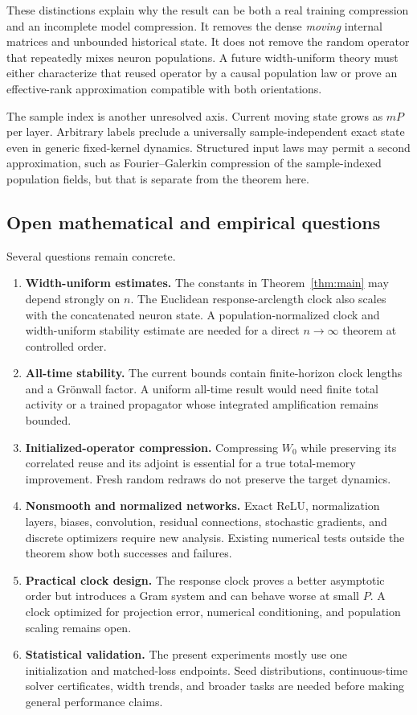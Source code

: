 These distinctions explain why the result can be both a real training
compression and an incomplete model compression.  It removes the dense
\emph{moving} internal matrices and unbounded historical state.  It does not
remove the random operator that repeatedly mixes neuron populations.  A future
width-uniform theory must either characterize that reused operator by a causal
population law or prove an effective-rank approximation compatible with both
orientations.

The sample index is another unresolved axis.  Current moving state grows as
$mP$ per layer.  Arbitrary labels preclude a universally sample-independent
exact state even in generic fixed-kernel dynamics.  Structured input laws may
permit a second approximation, such as Fourier--Galerkin compression of the
sample-indexed population fields, but that is separate from the theorem here.

\subsection{Open mathematical and empirical questions}

Several questions remain concrete.

\begin{enumerate}[leftmargin=*]
\item \textbf{Width-uniform estimates.}  The constants in
      Theorem~\ref{thm:main} may depend strongly on $n$.  The Euclidean
      response-arclength clock also scales with the concatenated neuron state.
      A population-normalized clock and width-uniform stability estimate are
      needed for a direct $n\to\infty$ theorem at controlled order.
\item \textbf{All-time stability.}  The current bounds contain finite-horizon
      clock lengths and a Gr\"onwall factor.  A uniform all-time result would
      need finite total activity or a trained propagator whose integrated
      amplification remains bounded.
\item \textbf{Initialized-operator compression.}  Compressing $W_0$ while
      preserving its correlated reuse and its adjoint is essential for a true
      total-memory improvement.  Fresh random redraws do not preserve the
      target dynamics.
\item \textbf{Nonsmooth and normalized networks.}  Exact ReLU, normalization
      layers, biases, convolution, residual connections, stochastic gradients,
      and discrete optimizers require new analysis.  Existing numerical tests
      outside the theorem show both successes and failures.
\item \textbf{Practical clock design.}  The response clock proves a better
      asymptotic order but introduces a Gram system and can behave worse at
      small $P$.  A clock optimized for projection error, numerical
      conditioning, and population scaling remains open.
\item \textbf{Statistical validation.}  The present experiments mostly use one
      initialization and matched-loss endpoints.  Seed distributions,
      continuous-time solver certificates, width trends, and broader tasks are
      needed before making general performance claims.
\end{enumerate}

